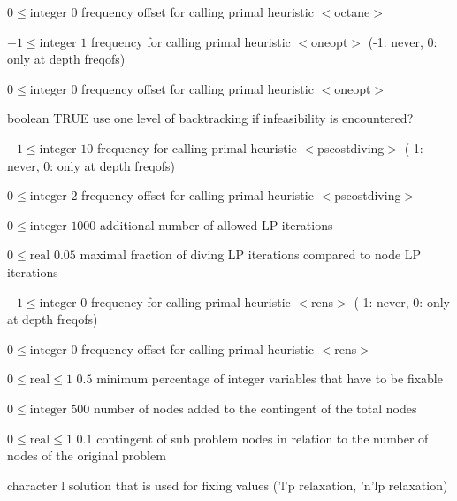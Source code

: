 %
{$0\leq\textrm{integer}$}%
{$0$}%
{frequency offset for calling primal heuristic $<$octane$>$}%
{}

%
{$-1\leq\textrm{integer}$}%
{$1$}%
{frequency for calling primal heuristic $<$oneopt$>$ (-1: never, 0: only at depth freqofs)}%
{}

%
{$0\leq\textrm{integer}$}%
{$0$}%
{frequency offset for calling primal heuristic $<$oneopt$>$}%
{}

%
{boolean}%
{TRUE}%
{use one level of backtracking if infeasibility is encountered?}%
{}

%
{$-1\leq\textrm{integer}$}%
{$10$}%
{frequency for calling primal heuristic $<$pscostdiving$>$ (-1: never, 0: only at depth freqofs)}%
{}

%
{$0\leq\textrm{integer}$}%
{$2$}%
{frequency offset for calling primal heuristic $<$pscostdiving$>$}%
{}

%
{$0\leq\textrm{integer}$}%
{$1000$}%
{additional number of allowed LP iterations}%
{}

%
{$0\leq\textrm{real}$}%
{$0.05$}%
{maximal fraction of diving LP iterations compared to node LP iterations}%
{}

%
{$-1\leq\textrm{integer}$}%
{$0$}%
{frequency for calling primal heuristic $<$rens$>$ (-1: never, 0: only at depth freqofs)}%
{}

%
{$0\leq\textrm{integer}$}%
{$0$}%
{frequency offset for calling primal heuristic $<$rens$>$}%
{}

%
{$0\leq\textrm{real}\leq1$}%
{$0.5$}%
{minimum percentage of integer variables that have to be fixable}%
{}

%
{$0\leq\textrm{integer}$}%
{$500$}%
{number of nodes added to the contingent of the total nodes}%
{}

%
{$0\leq\textrm{real}\leq1$}%
{$0.1$}%
{contingent of sub problem nodes in relation to the number of nodes of the original problem}%
{}

%
{character}%
{l}%
{solution that is used for fixing values ('l'p relaxation, 'n'lp relaxation)}%
{}

